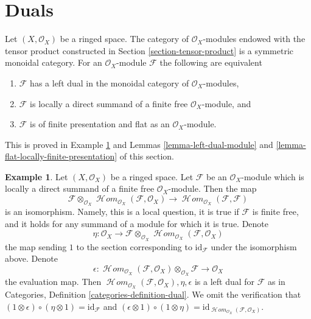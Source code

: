 \documentclass{stacks-project}
\theoremstyle{plain}
\theoremstyle{definition}
\newtheorem{example}[subsection]{Example}
\theoremstyle{remark}
\numberwithin{equation}{subsection}
\def\SheafHom{\mathop{\mathcal{H}\!\mathit{om}}\nolimits}
\begin{document}
\section{Duals}
\label{section-duals}

\noindent
Let $(X, \mathcal{O}_X)$ be a ringed space. The category of
$\mathcal{O}_X$-modules endowed with the tensor product
constructed in Section \ref{section-tensor-product}
is a symmetric monoidal category. For an $\mathcal{O}_X$-module
$\mathcal{F}$ the following are equivalent
\begin{enumerate}
\item $\mathcal{F}$ has a left dual in the monoidal category
of $\mathcal{O}_X$-modules,
\item $\mathcal{F}$ is locally a direct summand of a finite
free $\mathcal{O}_X$-module, and
\item $\mathcal{F}$ is of finite presentation and flat as an
$\mathcal{O}_X$-module.
\end{enumerate}
This is proved in Example \ref{example-dual} and
Lemmas \ref{lemma-left-dual-module} and
\ref{lemma-flat-locally-finite-presentation} of this section.

\begin{example}
\label{example-dual}
Let $(X, \mathcal{O}_X)$ be a ringed space. Let $\mathcal{F}$
be an $\mathcal{O}_X$-module which is locally a direct summand of a finite
free $\mathcal{O}_X$-module. Then the map
$$
\mathcal{F} \otimes_{\mathcal{O}_X}
\SheafHom_{\mathcal{O}_X}(\mathcal{F}, \mathcal{O}_X)
\longrightarrow
\SheafHom_{\mathcal{O}_X}(\mathcal{F}, \mathcal{F})
$$
is an isomorphism. Namely, this is a local question, it is true
if $\mathcal{F}$ is finite free, and it holds for any summand
of a module for which it is true. Denote
$$
\eta :
\mathcal{O}_X
\longrightarrow
\mathcal{F} \otimes_{\mathcal{O}_X}
\SheafHom_{\mathcal{O}_X}(\mathcal{F}, \mathcal{O}_X)
$$
the map sending $1$ to the section corresponding to
$\text{id}_\mathcal{F}$ under the isomorphism above.
Denote
$$
\epsilon : 
\SheafHom_{\mathcal{O}_X}(\mathcal{F}, \mathcal{O}_X)
\otimes_{\mathcal{O}_X} \mathcal{F}
\longrightarrow
\mathcal{O}_X
$$
the evaluation map. Then
$\SheafHom_{\mathcal{O}_X}(\mathcal{F}, \mathcal{O}_X), \eta, \epsilon$
is a left dual for $\mathcal{F}$ as in
Categories, Definition \ref{categories-definition-dual}.
We omit the verification that
$(1 \otimes \epsilon) \circ (\eta \otimes 1) = \text{id}_\mathcal{F}$
and
$(\epsilon \otimes 1) \circ (1 \otimes \eta) =
\text{id}_{\SheafHom_{\mathcal{O}_X}(\mathcal{F}, \mathcal{O}_X)}$.
\end{example}
\end{document}
